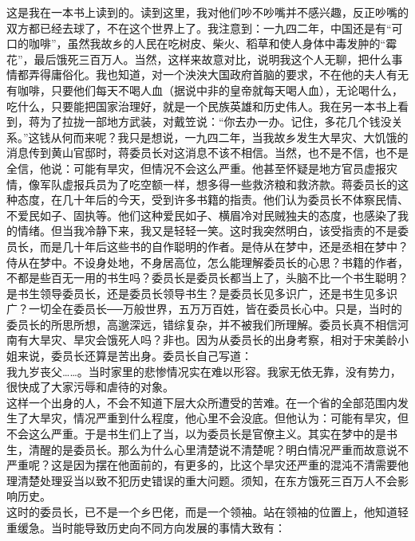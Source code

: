 这是我在一本书上读到的。读到这里，我对他们吵不吵嘴并不感兴趣，反正吵嘴的双方都已经去球了，不在这个世界上了。我注意到：一九四二年，中国还是有“可口的咖啡”，虽然我故乡的人民在吃树皮、柴火、稻草和使人身体中毒发肿的“霉花”，最后饿死三百万人。当然，这样来故意对比，说明我这个人无聊，把什么事情都弄得庸俗化。我也知道，对一个泱泱大国政府首脑的要求，不在他的夫人有无有咖啡，只要他们每天不喝人血（据说中非的皇帝就每天喝人血），无论喝什么，吃什么，只要能把国家治理好，就是一个民族英雄和历史伟人。我在另一本书上看到，蒋为了拉拢一部地方武装，对戴笠说：“你去办一办。记住，多花几个钱没关系。”这钱从何而来呢？我只是想说，一九四二年，当我故乡发生大旱灾、大饥饿的消息传到黄山官邸时，蒋委员长对这消息不该不相信。当然，也不是不信，也不是全信，他说：可能有旱灾，但情况不会这么严重。他甚至怀疑是地方官员虚报灾情，像军队虚报兵员为了吃空额一样，想多得一些救济粮和救济款。蒋委员长的这种态度，在几十年后的今天，受到许多书籍的指责。他们认为委员长不体察民情、不爱民如子、固执等。他们这种爱民如子、横眉冷对民贼独夫的态度，也感染了我的情绪。但当我冷静下来，我又是轻轻一笑。这时我突然明白，该受指责的不是委员长，而是几十年后这些书的自作聪明的作者。是侍从在梦中，还是丞相在梦中？侍从在梦中。不设身处地，不身居高位，怎么能理解委员长的心思？书籍的作者，不都是些百无一用的书生吗？委员长是委员长都当上了，头脑不比一个书生聪明？是书生领导委员长，还是委员长领导书生？是委员长见多识广，还是书生见多识广？一切全在委员长──万般世界，五万万百姓，皆在委员长心中。只是，当时的委员长的所思所想，高邈深远，错综复杂，并不被我们所理解。委员长真不相信河南有大旱灾、旱灾会饿死人吗？非也。因为从委员长的出身考察，相对于宋美龄小姐来说，委员长还算是苦出身。委员长自己写道：\\

我九岁丧父……。当时家里的悲惨情况实在难以形容。我家无依无靠，没有势力，很快成了大家污辱和虐待的对象。\\

这样一个出身的人，不会不知道下层大众所遭受的苦难。在一个省的全部范围内发生了大旱灾，情况严重到什么程度，他心里不会没底。但他认为：可能有旱灾，但不会这么严重。于是书生们上了当，以为委员长是官僚主义。其实在梦中的是书生，清醒的是委员长。那么为什么心里清楚说不清楚呢？明白情况严重而故意说不严重呢？这是因为摆在他面前的，有更多的，比这个旱灾还严重的混沌不清需要他理清楚处理妥当以致不犯历史错误的重大问题。须知，在东方饿死三百万人不会影响历史。\\

这时的委员长，已不是一个乡巴佬，而是一个领袖。站在领袖的位置上，他知道轻重缓急。当时能导致历史向不同方向发展的事情大致有：\\

